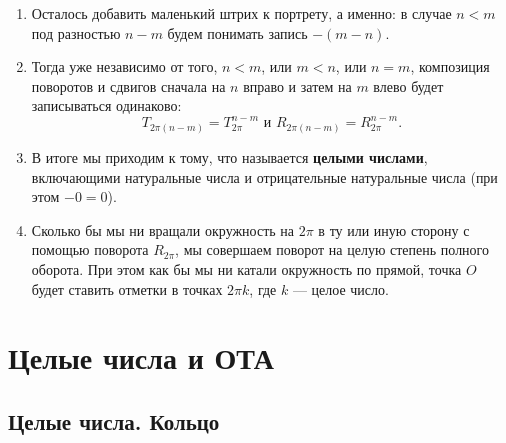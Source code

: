 \begin{enumerate}
\item Осталось добавить маленький штрих к портрету, а именно: в случае $n<m$ под разностью $n-m$ будем понимать запись $-(m-n)$.
\item Тогда уже независимо от того, $n<m$, или $m<n$, или $n=m$, композиция поворотов и сдвигов сначала на $n$ вправо и затем на $m$ влево будет записываться одинаково:
$$
T_{2\pi(n-m)}=T_{2\pi}^{n-m}\mbox{ и }R_{2\pi(n-m)}=R_{2\pi}^{n-m}.
$$
\item В итоге мы приходим к тому, что называется \textbf{целыми числами}, включающими натуральные числа и отрицательные натуральные числа (при этом $-0=0$).
\item Сколько бы мы ни вращали окружность на $2\pi$ в ту или иную сторону с помощью поворота $R_{2\pi}$, мы совершаем поворот на целую степень полного оборота. При этом как бы мы ни катали окружность по прямой, точка $O$ будет ставить отметки в точках $2\pi k$, где $k$ --- целое число.
\end{enumerate}






\chapter{Целые числа и ОТА}


\section{Целые числа. Кольцо}


